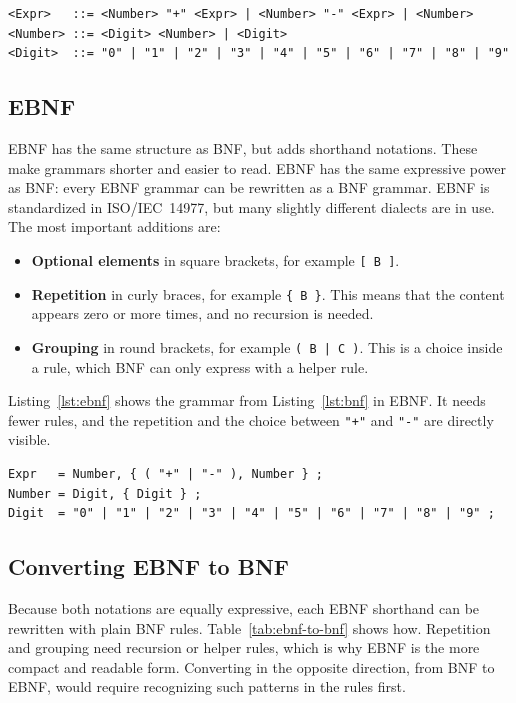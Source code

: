 \documentclass[thesis]{plai}
\begin{document}
\begin{lstlisting}[caption={A grammar for addition and subtraction of numbers in BNF.}, label={lst:bnf}, basicstyle=\small\ttfamily, numbers=none, aboveskip=8pt, belowskip=4pt]
<Expr>   ::= <Number> "+" <Expr> | <Number> "-" <Expr> | <Number>
<Number> ::= <Digit> <Number> | <Digit>
<Digit>  ::= "0" | "1" | "2" | "3" | "4" | "5" | "6" | "7" | "8" | "9"
\end{lstlisting}

\subsection{EBNF}
EBNF has the same structure as BNF, but adds shorthand notations. These make grammars shorter and easier to read. EBNF has the same expressive power as BNF: every EBNF grammar can be rewritten as a BNF grammar. EBNF is standardized in ISO/IEC~14977, but many slightly different dialects are in use. The most important additions are:
\begin{itemize}
    \item \textbf{Optional elements} in square brackets, for example \verb|[ B ]|.
    \item \textbf{Repetition} in curly braces, for example \verb|{ B }|. This means that the content appears zero or more times, and no recursion is needed.
    \item \textbf{Grouping} in round brackets, for example \verb#( B | C )#. This is a choice inside a rule, which BNF can only express with a helper rule.
\end{itemize}

Listing~\ref{lst:ebnf} shows the grammar from Listing~\ref{lst:bnf} in EBNF. It needs fewer rules, and the repetition and the choice between \verb|"+"| and \verb|"-"| are directly visible.

\begin{lstlisting}[caption={The grammar from Listing~\ref{lst:bnf} in EBNF.}, label={lst:ebnf}, basicstyle=\small\ttfamily, numbers=none, aboveskip=8pt, belowskip=4pt]
Expr   = Number, { ( "+" | "-" ), Number } ;
Number = Digit, { Digit } ;
Digit  = "0" | "1" | "2" | "3" | "4" | "5" | "6" | "7" | "8" | "9" ;
\end{lstlisting}

\subsection{Converting EBNF to BNF}
Because both notations are equally expressive, each EBNF shorthand can be rewritten with plain BNF rules. Table~\ref{tab:ebnf-to-bnf} shows how. Repetition and grouping need recursion or helper rules, which is why EBNF is the more compact and readable form. Converting in the opposite direction, from BNF to EBNF, would require recognizing such patterns in the rules first.
\end{document}
